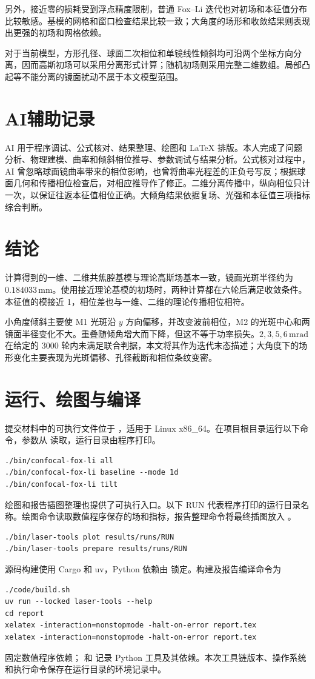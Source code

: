 \documentclass[UTF8,a4paper,11pt,fontset=fandol]{ctexart}
\begin{document}
另外，接近零的损耗受到浮点精度限制，普通 Fox--Li 迭代也对初场和本征值分布比较敏感。基模的网格和窗口检查结果比较一致；大角度的场形和收敛结果则表现出更强的初场和网格依赖。

对于当前模型，方形孔径、球面二次相位和单镜线性倾斜均可沿两个坐标方向分离，因而高斯初场可以采用分离形式计算；随机初场则采用完整二维数组。局部凸起等不能分离的镜面扰动不属于本文模型范围。

\section{AI辅助记录}
AI 用于程序调试、公式核对、结果整理、绘图和 LaTeX 排版。本人完成了问题分析、物理建模、曲率和倾斜相位推导、参数调试与结果分析。公式核对过程中，AI 曾忽略球面镜曲率带来的相位影响，也曾将曲率光程差的正负号写反；根据球面几何和传播相位检查后，对相应推导作了修正。二维分离传播中，纵向相位只计一次，以保证往返本征值相位正确。大倾角结果依据复场、光强和本征值三项指标综合判断。

\section{结论}
计算得到的一维、二维共焦腔基模与理论高斯场基本一致，镜面光斑半径约为 $0.184033\,\mathrm{mm}$。使用接近理论基模的初场时，两种计算都在六轮后满足收敛条件。本征值的模接近 1，相位差也与一维、二维的理论传播相位相符。

小角度倾斜主要使 M1 光斑沿 $y$ 方向偏移，并改变波前相位，M2 的光斑中心和两镜面半径变化不大。重叠随倾角增大而下降，但这不等于功率损失。$2,3,5,6\,\mathrm{mrad}$ 在给定的 3000 轮内未满足联合判据，本文将其作为迭代末态描述；大角度下的场形变化主要表现为光斑偏移、孔径截断和相位条纹变密。

\appendix
\section{运行、绘图与编译}
提交材料中的可执行文件位于 ，适用于 Linux x86\_64。在项目根目录运行以下命令，参数从  读取，运行目录由程序打印。
\begin{lstlisting}
./bin/confocal-fox-li all
./bin/confocal-fox-li baseline --mode 1d
./bin/confocal-fox-li tilt
\end{lstlisting}
绘图和报告插图整理也提供了可执行入口。以下 RUN 代表程序打印的运行目录名称。绘图命令读取数值程序保存的场和指标，报告整理命令将最终插图放入 。
\begin{lstlisting}
./bin/laser-tools plot results/runs/RUN
./bin/laser-tools prepare results/runs/RUN
\end{lstlisting}
源码构建使用 Cargo 和 uv，Python 依赖由  锁定。构建及报告编译命令为
\begin{lstlisting}
./code/build.sh
uv run --locked laser-tools --help
cd report
xelatex -interaction=nonstopmode -halt-on-error report.tex
xelatex -interaction=nonstopmode -halt-on-error report.tex
\end{lstlisting}
 固定数值程序依赖； 和  记录 Python 工具及其依赖。本次工具链版本、操作系统和执行命令保存在运行目录的环境记录中。
\end{document}
